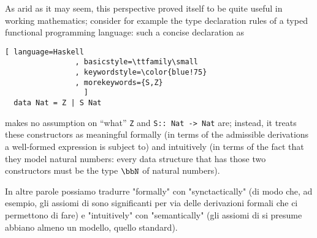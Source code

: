 As arid as it may seem, this perspective proved itself to be quite useful in working mathematics; consider for example the type declaration rules of a typed functional programming language: such a concise declaration as
\begin{lstlisting}[ language=Haskell
                , basicstyle=\ttfamily\small
                , keywordstyle=\color{blue!75}
                , morekeywords={S,Z}
                  ]
  data Nat = Z | S Nat
\end{lstlisting}
makes no assumption on ``what'' \verb|Z| and \verb|S:: Nat -> Nat| are; instead, it treats these constructors as meaningful formally (in terms of the admissible derivations a well-formed expression is subject to) and intuitively (in terms of the fact that they model natural numbers: every data structure that has those two constructors must be the type $\bbN$ of natural numbers).

In altre parole possiamo tradurre "formally" con "synctactically" (di modo che, ad esempio, gli assiomi di  sono significanti per via delle derivazioni formali che ci permettono di fare) e "intuitively" con "semantically" (gli assiomi di  si presume abbiano almeno un modello, quello standard).

